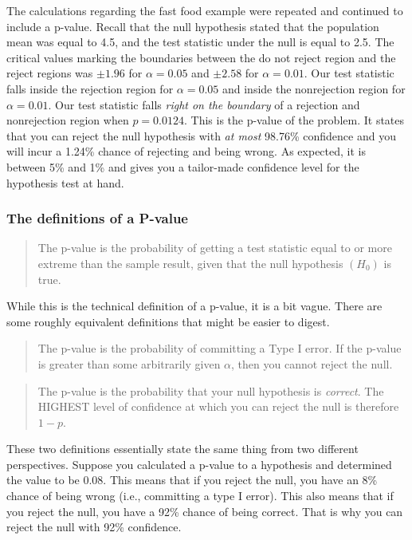 \documentclass[
]{book}
\begin{document}
The calculations regarding the fast food example were repeated and continued to include a p-value. Recall that the null hypothesis stated that the population mean was equal to 4.5, and the test statistic under the null is equal to 2.5. The critical values marking the boundaries between the do not reject region and the reject regions was \(\pm 1.96\) for \(\alpha=0.05\) and \(\pm 2.58\) for \(\alpha=0.01\). Our test statistic falls inside the rejection region for \(\alpha=0.05\) and inside the nonrejection region for \(\alpha=0.01\). Our test statistic falls \emph{right on the boundary} of a rejection and nonrejection region when \(p=0.0124\). This is the p-value of the problem. It states that you can reject the null hypothesis with \emph{at most} 98.76\% confidence and you will incur a 1.24\% chance of rejecting and being wrong. As expected, it is between 5\% and 1\% and gives you a tailor-made confidence level for the hypothesis test at hand.

\subsubsection*{The definitions of a P-value}\label{the-definitions-of-a-p-value}

\begin{quote}
The p-value is the probability of getting a test statistic equal to or more extreme than the sample result, given that the null hypothesis \((H_0)\) is true.
\end{quote}

While this is the technical definition of a p-value, it is a bit vague. There are some roughly equivalent definitions that might be easier to digest.

\begin{quote}
The p-value is the probability of committing a Type I error. If the p-value is greater than some arbitrarily given \(\alpha\), then you cannot reject the null.
\end{quote}

\begin{quote}
The p-value is the probability that your null hypothesis is \emph{correct}. The HIGHEST level of confidence at which you can reject the null is therefore \(1-p\).
\end{quote}

These two definitions essentially state the same thing from two different perspectives. Suppose you calculated a p-value to a hypothesis and determined the value to be 0.08. This means that if you reject the null, you have an 8\% chance of being wrong (i.e., committing a type I error). This also means that if you reject the null, you have a 92\% chance of being correct. That is why you can reject the null with 92\% confidence.
\end{document}
